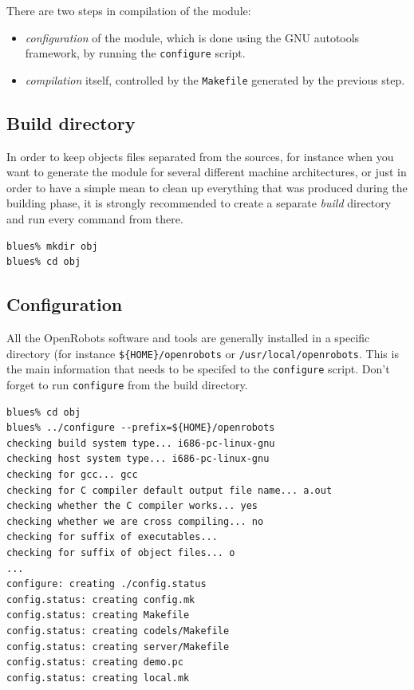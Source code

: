There are two steps in compilation of the module:
\begin{itemize}
\item \emph{configuration} of the module, which is done using the GNU
autotools framework, by running the \texttt{configure} script.
\item \emph{compilation} itself, controlled by the \texttt{Makefile}
generated by the previous step. 
\end{itemize}

\subsection{Build directory}
In order to keep objects files separated from the sources, for
instance when you want to generate the module for several different
machine architectures, or just in order to have a simple mean to clean
up everything that was produced during the building phase, it is
strongly recommended to create a separate \emph{build} directory and
run every command from there. 

\begin{center}
\begin{cartouche}\small
\begin{verbatim}
blues% mkdir obj
blues% cd obj
\end{verbatim}
\end{cartouche}
\end{center}

\subsection{Configuration}

All the  OpenRobots software  and tools are  generally  installed in a specific
directory           (for       instance    \texttt{\$\{HOME\}/openrobots}    or
\texttt{/usr/local/openrobots}.  This is the  main information that needs to be
specifed to the \texttt{configure} script. Don't forget to run
\texttt{configure} from the build directory.

\begin{center}
\begin{cartouche}\small
\begin{verbatim}
blues% cd obj
blues% ../configure --prefix=${HOME}/openrobots
checking build system type... i686-pc-linux-gnu
checking host system type... i686-pc-linux-gnu
checking for gcc... gcc
checking for C compiler default output file name... a.out
checking whether the C compiler works... yes
checking whether we are cross compiling... no
checking for suffix of executables... 
checking for suffix of object files... o
...
configure: creating ./config.status
config.status: creating config.mk
config.status: creating Makefile
config.status: creating codels/Makefile
config.status: creating server/Makefile
config.status: creating demo.pc
config.status: creating local.mk
\end{verbatim}
\end{cartouche}
\end{center}

